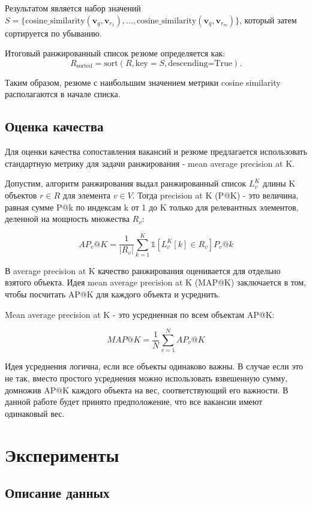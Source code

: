 \documentclass{article}
\begin{document}
Результатом является набор значений \( S = \{\text{cosine\_similarity}(\mathbf{v}_q, \mathbf{v}_{r_1}), \dots, \text{cosine\_similarity}(\mathbf{v}_q, \mathbf{v}_{r_m})\} \), который затем сортируется по убыванию.  

Итоговый ранжированный список резюме определяется как:  
\[
R_{\text{sorted}} = \text{sort}(R, \text{key} = S, \text{descending=True}).
\]  

Таким образом, резюме с наибольшим значением метрики cosine similarity располагаются в начале списка.

\subsection{Оценка качества}

Для оценки качества сопоставления вакансий и резюме предлагается использовать стандартную метрику для задачи ранжирования - mean average precision at K.

Допустим, алгоритм ранжирования выдал ранжированный список \(L^K_v\) длины K объектов \(r \in R\) для элемента \(v \in V\). Тогда precision at K (P@K) - это величина, равная сумме P@k по индексам k от 1 до K только для релевантных элементов, деленной на мощность множества \(R_v\):

\[AP_v@K = \frac{1}{|R_v|} \sum_{k=1}^{K}{\mathds{1} \left[ L^K_v[k] \in R_v \right] P_v@k}\]

В average precision at K качество ранжирования оценивается для отдельно взятого объекта. Идея mean average precision at K (MAP@K) заключается в том, чтобы посчитать AP@K для каждого объекта и усреднить.

Mean average precision at K - это усредненная по всем объектам AP@K: 

\[MAP@K = \frac{1}{N}\sum_{v=1}^{N} AP_v@K\]

Идея усреднения логична, если все объекты одинаково важны. В случае если это не так, вместо простого усреднения можно использовать взвешенную сумму, домножив AP@K каждого объекта на вес, соответствующий его важности. В данной работе будет принято предположение, что все вакансии имеют одинаковый вес.

\section{Эксперименты}
\subsection{Описание данных}
\end{document}
